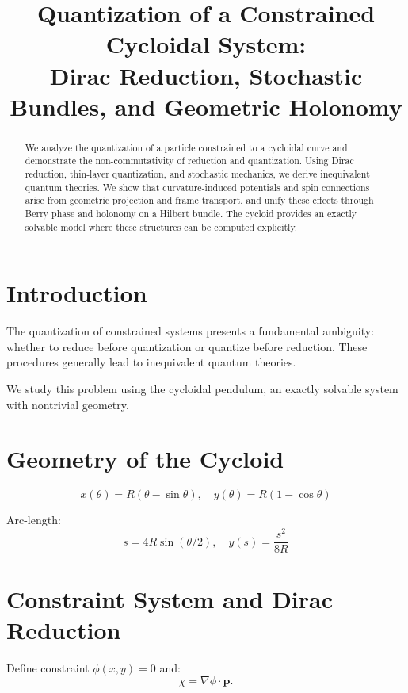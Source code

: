 \documentclass[11pt]{article}
\title{Quantization of a Constrained Cycloidal System:\\
Dirac Reduction, Stochastic Bundles, and Geometric Holonomy}
\author{}
\date{}
\begin{document}
\maketitle

\begin{abstract}
We analyze the quantization of a particle constrained to a cycloidal curve and demonstrate the non-commutativity of reduction and quantization. Using Dirac reduction, thin-layer quantization, and stochastic mechanics, we derive inequivalent quantum theories. We show that curvature-induced potentials and spin connections arise from geometric projection and frame transport, and unify these effects through Berry phase and holonomy on a Hilbert bundle. The cycloid provides an exactly solvable model where these structures can be computed explicitly.
\end{abstract}

\tableofcontents

\section{Introduction}

The quantization of constrained systems presents a fundamental ambiguity: whether to reduce before quantization or quantize before reduction. These procedures generally lead to inequivalent quantum theories.

We study this problem using the cycloidal pendulum, an exactly solvable system with nontrivial geometry.

\section{Geometry of the Cycloid}

\begin{equation}
x(\theta)=R(\theta-\sin\theta), \quad
y(\theta)=R(1-\cos\theta)
\end{equation}

Arc-length:
\begin{equation}
s = 4R\sin(\theta/2), \quad
y(s) = \frac{s^2}{8R}
\end{equation}

\section{Constraint System and Dirac Reduction}

Define constraint $\phi(x,y)=0$ and:
\[
\chi = \nabla\phi \cdot \mathbf{p}.
\]
\end{document}
